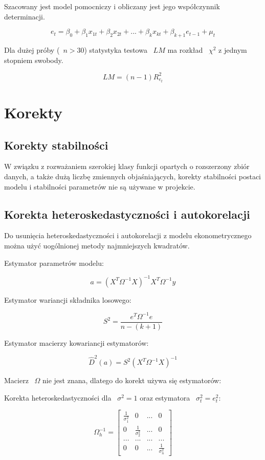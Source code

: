 \documentclass{article}
\begin{document}
Szacowany jest model pomocniczy i obliczany jest jego współczynnik determinacji.

\[e_t=\beta_0+\beta_1x_{1t}+\beta_2x_{2t}+...+\beta_kx_{kt}+\beta_{k+1}e_{t-1}+\mu_t\]

Dla dużej próby (~$n>30$) statystyka testowa ~$LM$ ma rozkład ~$\chi^2$ z jednym stopniem swobody.

\[LM = (n-1)R_{e_t}^2\]

\newpage
\section{Korekty}

\subsection{Korekty stabilności}
W związku z rozważaniem szerokiej klasy funkcji opartych o rozszerzony zbiór danych, a także dużą liczbę zmiennych objaśniających, korekty stabilności postaci modelu i stabilności parametrów nie są używane w projekcie.

\subsection{Korekta heteroskedastyczności i autokorelacji}
Do usunięcia heteroskedastyczności i autokorelacji z modelu ekonometrycznego można użyć uogólnionej metody najmniejszych kwadratów.

Estymator parametrów modelu:

\[a = (X^T\Omega^{-1}X)^{-1}X^T\Omega^{-1}y\]

Estymator wariancji składnika losowego:

\[S^2=\frac{e^T\Omega^{-1}e}{n - (k+1)}\]

Estymator macierzy kowariancji estymatorów:

\[\hat{D}^2(a)=S^2(X^T\Omega^{-1}X)^{-1}\]

Macierz ~$\Omega$ nie jest znana, dlatego do korekt używa się estymatorów:

Korekta heteroskedastyczności dla ~$\sigma^2 = 1$ oraz estymatora ~$\sigma_t^2=e_t^2$:

\begin{equation*}
    \Omega_{h}^{-1}=
    \begin{bmatrix}
        \frac{1}{\sigma_1^2} & 0 & ... & 0 \\
        0 & \frac{1}{\sigma_2^2} & ... & 0 \\
        ... & ... & ... & ... \\
        0 & 0 & ... & \frac{1}{\sigma_n^2}
    \end{bmatrix}
\end{equation*}
\end{document}
